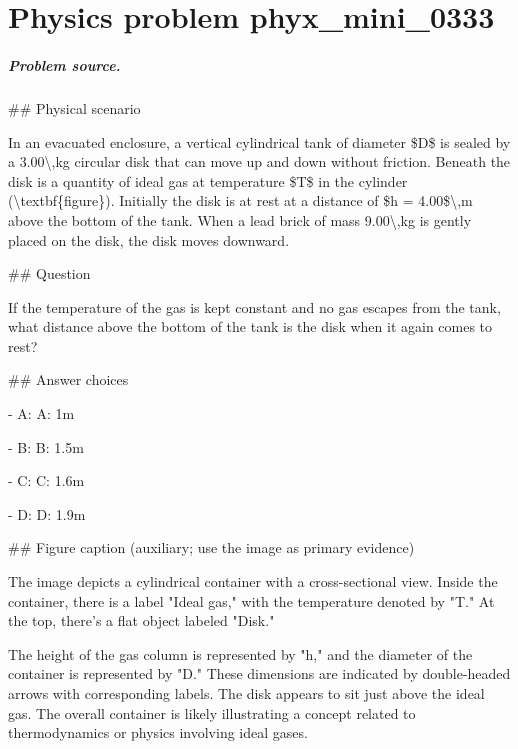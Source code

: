 
\chapter{Physics problem phyx\_mini\_0333}
\label{ch:PhyXMiniProblems_problem_phyx_mini_0333}

\paragraph{Problem source.}
\#\# Physical scenario

In an evacuated enclosure, a vertical cylindrical tank of diameter \$D\$ is sealed by a 3.00\textbackslash{},kg circular disk that can move up and down without friction. Beneath the disk is a quantity of ideal gas at temperature \$T\$ in the cylinder (\textbackslash{}textbf\{figure\}). Initially the disk is at rest at a distance of \$h = 4.00\$\textbackslash{},m above the bottom of the tank. When a lead brick of mass 9.00\textbackslash{},kg is gently placed on the disk, the disk moves downward.

\#\# Question

If the temperature of the gas is kept constant and no gas escapes from the tank, what distance above the bottom of the tank is the disk when it again comes to rest?

\#\# Answer choices

- A: A: 1m

- B: B: 1.5m

- C: C: 1.6m

- D: D: 1.9m

\#\# Figure caption (auxiliary; use the image as primary evidence)

The image depicts a cylindrical container with a cross-sectional view. Inside the container, there is a label "Ideal gas," with the temperature denoted by "T." At the top, there's a flat object labeled "Disk."

The height of the gas column is represented by "h," and the diameter of the container is represented by "D." These dimensions are indicated by double-headed arrows with corresponding labels. The disk appears to sit just above the ideal gas. The overall container is likely illustrating a concept related to thermodynamics or physics involving ideal gases.

